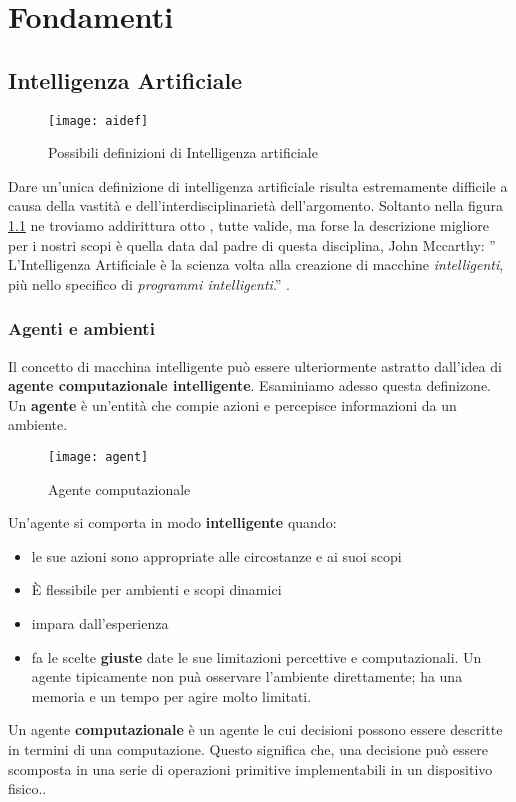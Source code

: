 \chapter{Fondamenti}

\section{Intelligenza Artificiale}

\begin{figure}
    \texttt{[image: aidef]}
    \caption{Possibili definizioni di Intelligenza artificiale}
    \label{fig:ai}
  \end{figure}
Dare un'unica definizione di intelligenza artificiale risulta estremamente difficile a causa della vastità
e dell'interdisciplinarietà dell'argomento. Soltanto nella figura \ref{fig:ai} ne  troviamo addirittura otto , tutte valide, ma forse
la descrizione  migliore per i nostri scopi  è quella data dal padre di questa disciplina, John Mccarthy:
'' L'Intelligenza Artificiale è la scienza volta alla creazione di macchine  \emph{intelligenti},
più nello specifico di \emph{programmi intelligenti}.'' \cite{ai}.
\subsection{Agenti e ambienti}
Il concetto di macchina intelligente può essere ulteriormente
astratto dall'idea di \textbf{agente computazionale intelligente}. Esaminiamo adesso questa definizone.
Un \textbf{agente} è un'entità che compie azioni
e percepisce informazioni da un ambiente.

\begin{figure}
  \centering
  \texttt{[image: agent]}
  \caption{Agente computazionale}
  \label{fig:agente}
\end{figure}

Un'agente si comporta in modo \textbf{intelligente} quando:
\begin{itemize}
  \item le sue azioni sono appropriate alle circostanze e ai suoi scopi
  \item È flessibile per ambienti e scopi dinamici
  \item impara dall'esperienza
  \item fa le scelte \textbf{giuste} date le sue limitazioni percettive e computazionali. Un agente tipicamente
  non puà osservare l'ambiente direttamente; ha una memoria e un tempo per agire molto limitati.
\end{itemize}
 Un agente \textbf{computazionale} è un agente le cui decisioni possono essere descritte in termini di una
 computazione. Questo significa che, una decisione può essere scomposta in una serie di operazioni primitive
 implementabili in un dispositivo fisico.\cite{PooleMackworth17}.
